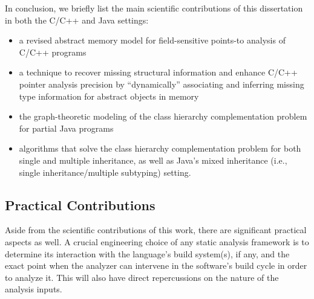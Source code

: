 In conclusion, we briefly list the main scientific contributions of
this dissertation in both the C/C++ and Java settings:
\begin{itemize}[--]
\item a revised abstract memory model for field-sensitive points-to
  analysis of C/C++ programs
\item a technique to recover missing structural information and
  enhance C/C++ pointer analysis precision by ``dynamically''
  associating and inferring missing type information for abstract
  objects in memory
\item the graph-theoretic modeling of the class hierarchy
  complementation problem for partial Java programs
\item algorithms that solve the class hierarchy complementation
  problem for both single and multiple inheritance, as well as Java's
  mixed inheritance (i.e., single inheritance/multiple subtyping)
  setting.
\end{itemize}


\subsection{Practical Contributions}

Aside from the scientific contributions of this work, there are
significant practical aspects as well. A crucial engineering choice of
any static analysis framework is to determine its interaction with the
language's build system(s), if any, and the exact point when the
analyzer can intervene in the software's build cycle in order to
analyze it. This will also have direct repercussions on the nature of
the analysis inputs.

